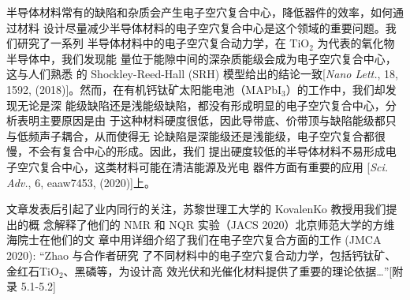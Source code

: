 \begin{enumerate}[label=\textnormal{\color{EmphColor}\Roman*.}]
  半导体材料常有的缺陷和杂质会产生电子空穴复合中心，降低器件的效率，如何通过材料
  设计尽量减少半导体材料的电子空穴复合中心是这个领域的重要问题。我们研究了一系列
  半导体材料中的电子空穴复合动力学，在 TiO$_2$ 为代表的氧化物半导体中，我们发现能
  量位于能隙中间的深杂质能级会成为电子空穴复合中心，这与人们熟悉
  的 Shockley-Reed-Hall (SRH) 模型给出的结论一致[\textit{Nano Lett.}, 18, 1592,
  (2018)]。然而，在有机钙钛矿太阳能电池（MAPbI$_3$）的工作中，我们却发现无论是深
  能级缺陷还是浅能级缺陷，都没有形成明显的电子空穴复合中心，分析表明主要原因是由
  于这种材料硬度很低，因此导带底、价带顶与缺陷能级都只与低频声子耦合，从而使得无
  论缺陷是深能级还是浅能级，电子空穴复合都很慢，不会有复合中心的形成。因此，我们
  提出硬度较低的半导体材料不易形成电子空穴复合中心，这类材料可能在清洁能源及光电
  器件方面有重要的应用 [\textit{Sci. Adv.}, 6, eaaw7453, (2020)]上。

  \begin{justify} \kaishu\color{magenta}{}

    文章发表后引起了业内同行的关注，苏黎世理工大学的 KovalenKo 教授用我们提出的概
    念解释了他们的 NMR 和 NQR 实验（JACS 2020）北京师范大学的方维海院士在他们的文
    章中用详细介绍了我们在电子空穴复合方面的工作 (JMCA 2020): “Zhao 与合作者研究
    了不同材料中的电子空穴复合动力学，包括钙钛矿、金红石TiO$_2$、黑磷等，为设计高
    效光伏和光催化材料提供了重要的理论依据\ldots{}”[附录 5.1-5.2]
  \end{justify} 
  
\end{enumerate}
